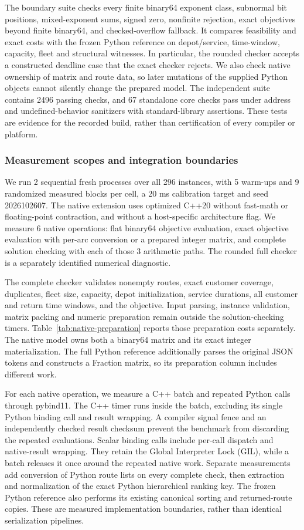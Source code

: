 The boundary suite checks every finite binary64 exponent class, subnormal bit positions, mixed-exponent sums, signed zero, nonfinite rejection, exact objectives beyond finite binary64, and checked-overflow fallback. It compares feasibility and exact costs with the frozen Python reference on depot/service, time-window, capacity, fleet and structural witnesses. In particular, the rounded checker accepts a constructed deadline case that the exact checker rejects. We also check native ownership of matrix and route data, so later mutations of the supplied Python objects cannot silently change the prepared model. The independent suite contains 2496 passing checks, and 67 standalone core checks pass under address and undefined-behavior sanitizers with standard-library assertions. These tests are evidence for the recorded build, rather than certification of every compiler or platform.

\subsubsection{Measurement scopes and integration boundaries}
We run 2 sequential fresh processes over all 296 instances, with 5 warm-ups and 9 randomized measured blocks per cell, a 20 ms calibration target and seed 2026102607. The native extension uses optimized C++20 without fast-math or floating-point contraction, and without a host-specific architecture flag. We measure 6 native operations: flat binary64 objective evaluation, exact objective evaluation with per-arc conversion or a prepared integer matrix, and complete solution checking with each of those 3 arithmetic paths. The rounded full checker is a separately identified numerical diagnostic.

The complete checker validates nonempty routes, exact customer coverage, duplicates, fleet size, capacity, depot initialization, service durations, all customer and return time windows, and the objective. Input parsing, instance validation, matrix packing and numeric preparation remain outside the solution-checking timers. Table~\ref{tab:native-preparation} reports those preparation costs separately. The native model owns both a binary64 matrix and its exact integer materialization. The full Python reference additionally parses the original JSON tokens and constructs a Fraction matrix, so its preparation column includes different work.

For each native operation, we measure a C++ batch and repeated Python calls through pybind11. The C++ timer runs inside the batch, excluding its single Python binding call and result wrapping. A compiler signal fence and an independently checked result checksum prevent the benchmark from discarding the repeated evaluations. Scalar binding calls include per-call dispatch and native-result wrapping. They retain the Global Interpreter Lock (GIL), while a batch releases it once around the repeated native work. Separate measurements add conversion of Python route lists on every complete check, then extraction and normalization of the exact Python hierarchical ranking key. The frozen Python reference also performs its existing canonical sorting and returned-route copies. These are measured implementation boundaries, rather than identical serialization pipelines.

